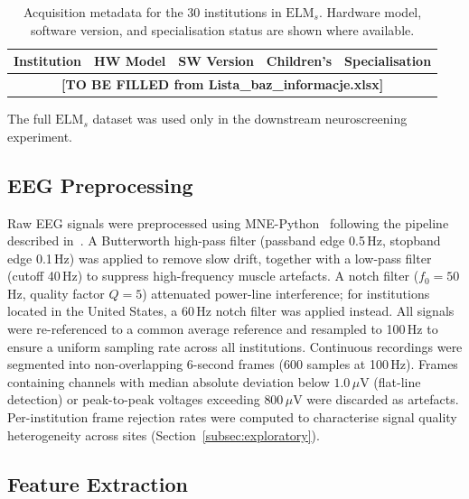 \documentclass[preprint,12pt]{elsarticle}
\begin{document}
\begin{table}[htbp]
  \centering
  \caption{Acquisition metadata for the 30 institutions in
    $\mathrm{ELM}_s$. Hardware model, software version, and
    specialisation status are shown where available.}
  \label{tab:acquisition_metadata}
  \begin{tabular}{lcccc}
    \toprule
    \textbf{Institution} & \textbf{HW Model} &
    \textbf{SW Version} & \textbf{Children's} &
    \textbf{Specialisation} \\
    \midrule
    \multicolumn{5}{c}{\textbf{[TO BE FILLED from
      Lista\_baz\_informacje.xlsx]}} \\
    \bottomrule
  \end{tabular}
\end{table}

The full $\mathrm{ELM}_s$ dataset was used only in the downstream
neuroscreening experiment.

\subsection{EEG Preprocessing}
\label{subsec:preprocessing}

Raw EEG signals were preprocessed using
MNE-Python~\cite{gramfort2013mne} following the pipeline described
in~\cite{poziomska2026quantity}.
A Butterworth high-pass filter (passband edge 0.5\,Hz, stopband edge
0.1\,Hz) was applied to remove slow drift, together with a low-pass
filter (cutoff 40\,Hz) to suppress high-frequency muscle artefacts.
A notch filter ($f_0 = 50$\,Hz, quality factor $Q = 5$) attenuated
power-line interference; for institutions located in the United
States, a 60\,Hz notch filter was applied instead.
All signals were re-referenced to a common average reference and
resampled to 100\,Hz to ensure a uniform sampling rate across all
institutions.
Continuous recordings were segmented into non-overlapping 6-second
frames (600 samples at 100\,Hz).
Frames containing channels with median absolute deviation below
$1.0\,\mu\text{V}$ (flat-line detection) or peak-to-peak voltages
exceeding $800\,\mu\text{V}$ were discarded as artefacts.
Per-institution frame rejection rates were computed to characterise
signal quality heterogeneity across sites
(Section~\ref{subsec:exploratory}).

\subsection{Feature Extraction}
\label{subsec:features}
\end{document}
